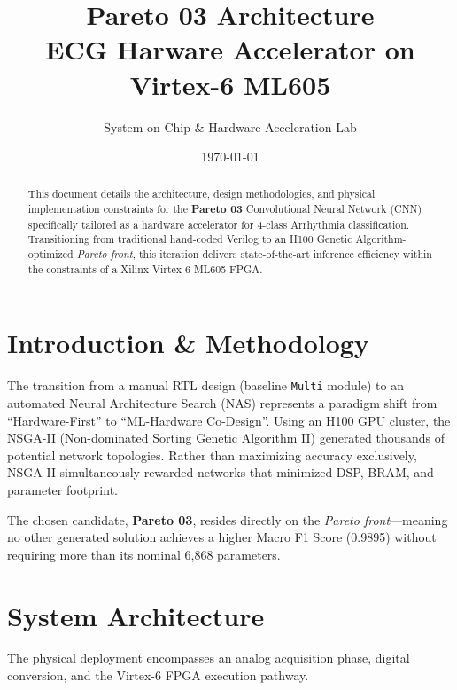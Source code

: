 \documentclass[11pt,a4paper,twocolumn]{article}
\title{\vspace{-1.5cm}\Huge\bfseries\color{primary} Pareto 03 Architecture \\ \Large ECG Harware Accelerator on Virtex-6 ML605}
\author{\large System-on-Chip \& Hardware Acceleration Lab}
\date{\vspace{-0.5cm}\today}
\begin{document}
\maketitle
\thispagestyle{empty}

\begin{abstract}
This document details the architecture, design methodologies, and physical implementation constraints for the \textbf{Pareto 03} Convolutional Neural Network (CNN) specifically tailored as a hardware accelerator for 4-class Arrhythmia classification. Transitioning from traditional hand-coded Verilog to an H100 Genetic Algorithm-optimized \textit{Pareto front}, this iteration delivers state-of-the-art inference efficiency within the constraints of a Xilinx Virtex-6 ML605 FPGA.
\end{abstract}

\section{Introduction \& Methodology}

The transition from a manual RTL design (baseline \texttt{Multi} module) to an automated Neural Architecture Search (NAS) represents a paradigm shift from ``Hardware-First'' to ``ML-Hardware Co-Design''. Using an H100 GPU cluster, the NSGA-II (Non-dominated Sorting Genetic Algorithm II) generated thousands of potential network topologies. Rather than maximizing accuracy exclusively, NSGA-II simultaneously rewarded networks that minimized DSP, BRAM, and parameter footprint.

The chosen candidate, \textbf{Pareto 03}, resides directly on the \textit{Pareto front}—meaning no other generated solution achieves a higher Macro F1 Score (0.9895) without requiring more than its nominal 6,868 parameters.

\section{System Architecture}

The physical deployment encompasses an analog acquisition phase, digital conversion, and the Virtex-6 FPGA execution pathway. 
\end{document}
